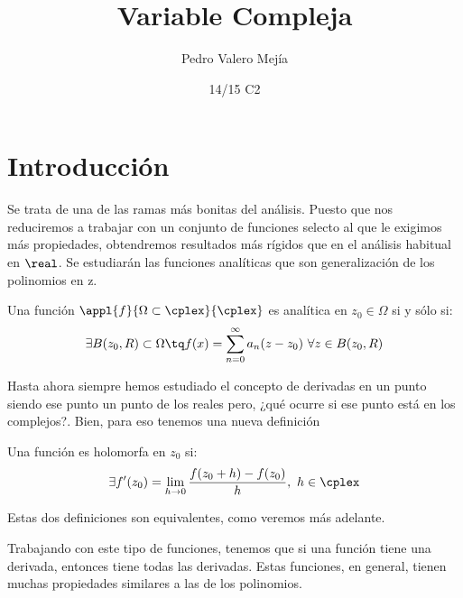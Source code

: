 \documentclass{apuntes}
\title{Variable Compleja}
\author{Pedro Valero Mejía}
\date{14/15 C2}
\begin{document}
\pagestyle{plain}
\maketitle

\tableofcontents
\newpage
\chapter{Introducción}
Se trata de una de las ramas más bonitas del análisis. Puesto que nos reduciremos a trabajar con un conjunto de funciones selecto al que le exigimos más propiedades, obtendremos resultados más rígidos que en el análisis habitual en $\real$. Se estudiarán las funciones analíticas que son generalización de los polinomios en z.

\begin{defn}
Una función $\appl{f}{\Omega \subset \cplex}{\cplex}$ es analítica en $z_0\in\Omega$ si y sólo si:
\[\exists B(z_0,R)\subset \Omega \tq f(x)=\sum_{n=0}^{\infty}a_n(z-z_0) \ \forall z \in B(z_0, R)\]
\end{defn}

Hasta ahora siempre hemos estudiado el concepto de derivadas en un punto siendo ese punto un punto de los reales pero, ¿qué ocurre si ese punto está en los complejos?. Bien, para eso tenemos una nueva definición

\begin{defn}
Una función es holomorfa en $z_0$ si:
\[\exists f'(z_0)=\lim_{h \to 0}\frac{f(z_0+h)-f(z_0)}{h}, \ h \in \cplex\]
\end{defn}

Estas dos definiciones son equivalentes, como veremos más adelante.

Trabajando con este tipo de funciones, tenemos que si una función tiene una derivada, entonces tiene todas las derivadas. Estas funciones, en general, tienen muchas propiedades similares a las de los polinomios.
\end{document}
